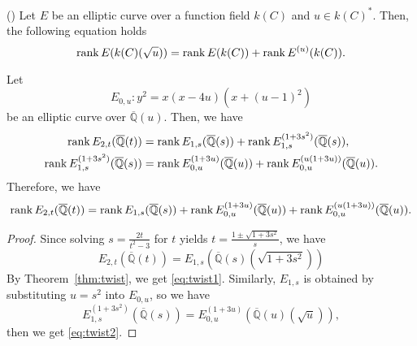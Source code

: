 \documentclass[main]{subfiles}
\begin{document}
\begin{thm}{(\cite[Exercise 10.16]{ref:aec})}
    \label{thm:twist}
    Let $E$ be an elliptic curve over a function field $k(C)$ and $u \in k(C)^*$.
    Then, the following equation holds
    \begin{equation*}
        \operatorname{rank} E(k(C)(\sqrt{u})) = \operatorname{rank} E(k(C)) + \operatorname{rank} E^{(u)}(k(C)).
    \end{equation*}
\end{thm}

\begin{thm}
    Let
    \begin{equation*}
        E_{0,u}: y^{2} = x(x - 4u)(x + (u - 1)^{2})
    \end{equation*}
    be an elliptic curve over $\overline{\mathbb{Q}}(u)$.
    Then, we have
    \begin{align}
        \operatorname{rank} E_{2,t}(\overline{\mathbb{Q}}(t))                & = \operatorname{rank} E_{1,s}(\overline{\mathbb{Q}}(s)) + \operatorname{rank} E_{1,s}^{(1 + 3s^{2})}(\overline{\mathbb{Q}}(s)), \label{eq:twist1}           \\
        \operatorname{rank} E_{1,s}^{(1 + 3s^{2})}(\overline{\mathbb{Q}}(s)) & = \operatorname{rank} E_{0,u}^{(1 + 3u)}(\overline{\mathbb{Q}}(u)) + \operatorname{rank} E_{0,u}^{(u(1 + 3u))}(\overline{\mathbb{Q}}(u)). \label{eq:twist2}
    \end{align}
    Therefore, we have
    \begin{equation*}
        \operatorname{rank} E_{2,t}(\overline{\mathbb{Q}}(t)) = \operatorname{rank} E_{1,s}(\overline{\mathbb{Q}}(s)) + \operatorname{rank} E_{0,u}^{(1 + 3u)}(\overline{\mathbb{Q}}(u)) + \operatorname{rank} E_{0,u}^{(u(1 + 3u))}(\overline{\mathbb{Q}}(u)).
    \end{equation*}
\end{thm}
\begin{proof}
    Since solving $s = \frac{2t}{t^{2} - 3}$ for $t$ yields $t = \frac{1 \pm \sqrt{1 + 3s^{2}}}{s}$, we have
    \begin{equation*}
        E_{2,t}(\overline{\mathbb{Q}}(t)) = E_{1,s}(\overline{\mathbb{Q}}(s)(\sqrt{1 + 3s^{2}}))
    \end{equation*}
    By Theorem~\ref{thm:twist}, we get \eqref{eq:twist1}.
    Similarly, $E_{1,s}$ is obtained by substituting $u = s^{2}$ into $E_{0,u}$, so we have
    \begin{equation*}
        E_{1,s}^{(1 + 3s^{2})}(\overline{\mathbb{Q}}(s)) = E_{0,u}^{(1 + 3u)}(\overline{\mathbb{Q}}(u)(\sqrt{u})),
    \end{equation*}
    then we get \eqref{eq:twist2}.
\end{proof}
\end{document}
